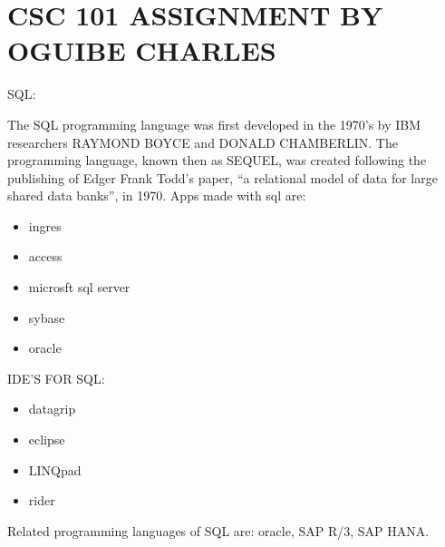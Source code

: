 \documentclass{article}
\begin{document}
	\section{CSC 101 ASSIGNMENT BY OGUIBE CHARLES}
	{SQL:}
	
    The SQL programming language was first developed in the 1970’s by IBM researchers RAYMOND BOYCE and DONALD CHAMBERLIN. The programming language, known then as SEQUEL, was created following the publishing of Edger Frank Todd’s paper, “a relational model of data for large shared data banks”, in 1970.
    Apps made with sql are:
    \begin{itemize}
    	\item {ingres}
    	\item{access}
    	\item{microsft sql server}
    	\item{sybase}
    	\item{oracle}
    \end{itemize}

  {IDE'S FOR SQL:}
  \begin{itemize}
  	\item {datagrip}
  	\item{eclipse}
  	\item{LINQpad}
  	\item{rider} 
  \end{itemize}
     
       Related programming languages of SQL are: oracle, SAP R/3, SAP HANA.
       
    
\end{document}
